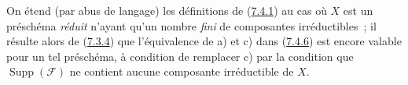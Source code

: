 \begin{env}[7.4.7]
\label{I.7.4.7-fr}
On étend (par abus de langage) les définitions de
(\hyperref[I.7.4.1-fr]{7.4.1}) au cas où $X$ est un préschéma
\emph{réduit} n'ayant qu'un nombre \emph{fini} de composantes irréductibles~;
il résulte alors de (\hyperref[I.7.3.4-fr]{7.3.4}) que l'équivalence de a) et
c) dans (\hyperref[I.7.4.6-fr]{7.4.6}) est encore valable pour un tel
préschéma, à condition de remplacer c) par la condition que
$\operatorname{Supp}(\mathscr{F})$ ne contient aucune composante irréductible de $X$.
\end{env}
